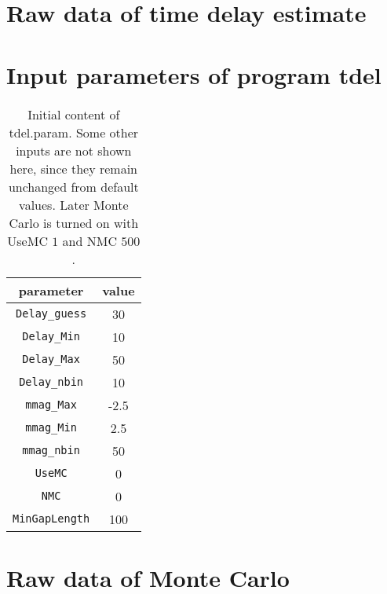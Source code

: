 \clearpage
\section{Raw data of time delay estimate}\label{app:timdel}


\clearpage
\section{Input parameters of program tdel}
\begin{table}[ht]
	\centering
	\begin{tabular}{cc}
		\toprule
		parameter & value \\	
		\midrule
		\verb|Delay_guess| & 30 \\
		\verb|Delay_Min| & 10 \\
		\verb|Delay_Max| & 50 \\
		\verb|Delay_nbin| & 10 \\
		\verb|mmag_Max| & -2.5 \\
		\verb|mmag_Min| & 2.5 \\
		\verb|mmag_nbin| & 50 \\
		\verb|UseMC| &	0 \\
		\verb|NMC| & 0\\
		\verb|MinGapLength| & 100\\
		\bottomrule
	\end{tabular} 
	\caption{Initial content of tdel.param. Some other inputs are not shown here, since they remain unchanged from default values. Later Monte Carlo is turned on with UseMC $1$ and NMC $500$.}
	\label{tab:tdelInParam}
\end{table}

\clearpage
\section{Raw data of Monte Carlo}\label{app:MCout}



